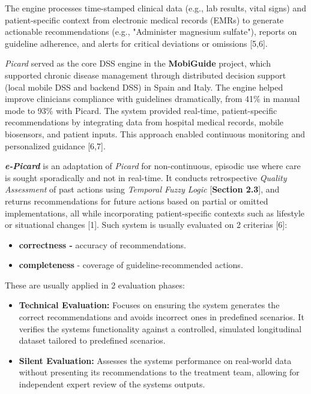 \documentclass[
]{article}
\begin{document}
The engine processes time-stamped clinical data (e.g., lab results,
vital signs) and patient-specific context from electronic medical
records (EMRs) to generate actionable recommendations (e.g., "Administer
magnesium sulfate"), reports on guideline adherence, and alerts for
critical deviations or omissions {[}5,6{]}.

\emph{Picard} served as the core DSS engine in the \textbf{MobiGuide}
project, which supported chronic disease management through distributed
decision support (local mobile DSS and backend DSS) in Spain and Italy.
The engine helped improve clinicians\textquotesingle{} compliance with
guidelines dramatically, from 41\% in manual mode to 93\% with Picard.
The system provided real-time, patient-specific recommendations by
integrating data from hospital medical records, mobile biosensors, and
patient inputs. This approach enabled continuous monitoring and
personalized guidance {[}6,7{]}.

\emph{\textbf{e-Picard}} is an adaptation of \emph{Picard} for
non-continuous, episodic use where care is sought sporadically and not
in real-time. It conducts retrospective \emph{Quality Assessment} of
past actions using \emph{Temporal Fuzzy Logic} {[}\textbf{Section
2.3}{]}, and returns recommendations for future actions based on partial
or omitted implementations, all while incorporating patient-specific
contexts such as lifestyle or situational changes {[}1{]}. Such system
is usually evaluated on 2 criterias {[}6{]}:

\begin{itemize}
\item
  \textbf{correctness -} accuracy of recommendations.
\item
  \textbf{completeness} - coverage of guideline-recommended actions.
\end{itemize}

These are usually applied in 2 evaluation phases:

\begin{itemize}
\item
  \textbf{Technical Evaluation:} Focuses on ensuring the system
  generates the correct recommendations and avoids incorrect ones in
  predefined scenarios. It verifies the system\textquotesingle s
  functionality against a controlled, simulated longitudinal dataset
  tailored to predefined scenarios.
\item
  \textbf{Silent Evaluation:} Assesses the system\textquotesingle s
  performance on real-world data without presenting its recommendations
  to the treatment team, allowing for independent expert review of the
  system\textquotesingle s outputs.
\end{itemize}
\end{document}
